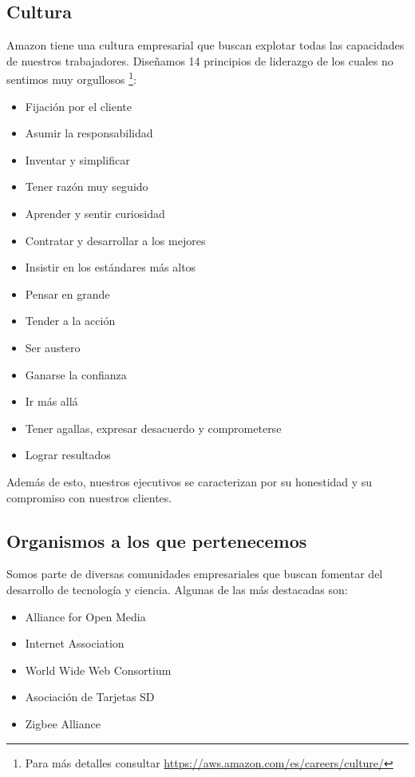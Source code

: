 \documentclass[11pt,a4paper]{article}
\begin{document}
\subsection{Cultura}

\noindent Amazon tiene una cultura empresarial que buscan explotar todas las capacidades de nuestros trabajadores. Diseñamos 14 principios de liderazgo de los cuales no sentimos muy orgullosos \footnote{Para más detalles consultar \url{https://aws.amazon.com/es/careers/culture/}}:
\begin{itemize}
\item Fijación por el cliente
\item Asumir la responsabilidad
\item Inventar y simplificar
\item Tener razón muy seguido
\item Aprender y sentir curiosidad
\item Contratar y desarrollar a los mejores
\item Insistir en los estándares más altos
\item Pensar en grande
\item Tender a la acción
\item Ser austero
\item Ganarse la confianza
\item Ir más allá
\item Tener agallas, expresar desacuerdo y comprometerse
\item Lograr resultados
\end{itemize}

\noindent Además de esto, nuestros ejecutivos se caracterizan por su honestidad y su compromiso con nuestros clientes.

\subsection{Organismos a los que pertenecemos }

\noindent Somos parte de diversas comunidades empresariales que buscan fomentar del desarrollo de  tecnología y ciencia. Algunas de las más destacadas son:
\begin{itemize}
\item Alliance for Open Media
\item Internet Association
\item World Wide Web Consortium
\item  Asociación de Tarjetas SD
\item Zigbee Alliance
\end{itemize}
\end{document}

